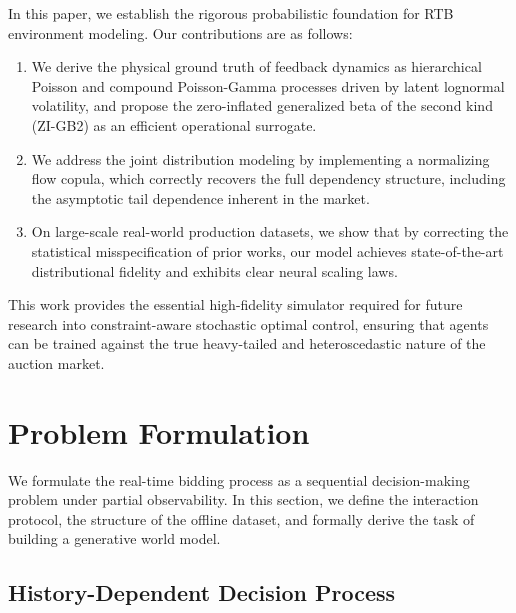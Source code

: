 \documentclass[sigconf, anonymous, review]{acmart}
\begin{document}
In this paper, we establish the rigorous probabilistic foundation for RTB environment modeling. Our contributions are as follows:
\begin{enumerate}
    \item We derive the physical ground truth of feedback dynamics as hierarchical Poisson and compound Poisson-Gamma processes driven by latent lognormal volatility, and propose the zero-inflated generalized beta of the second kind (ZI-GB2) as an efficient operational surrogate.

    \item We address the joint distribution modeling by implementing a normalizing flow copula, which correctly recovers the full dependency structure, including the asymptotic tail dependence inherent in the market.
    
    \item On large-scale real-world production datasets, we show that by correcting the statistical misspecification of prior works, our model achieves state-of-the-art distributional fidelity and exhibits clear neural scaling laws.
\end{enumerate}
This work provides the essential high-fidelity simulator required for future research into constraint-aware stochastic optimal control, ensuring that agents can be trained against the true heavy-tailed and heteroscedastic nature of the auction market.

\section{Problem Formulation}

We formulate the real-time bidding process as a sequential decision-making problem under partial observability. In this section, we define the interaction protocol, the structure of the offline dataset, and formally derive the task of building a generative world model.


\subsection{History-Dependent Decision Process}
\end{document}
